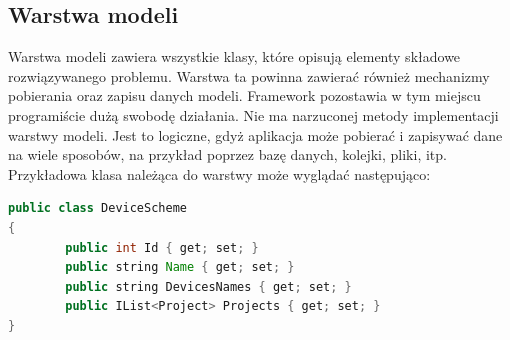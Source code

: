 \subsection{Warstwa modeli}
Warstwa modeli zawiera wszystkie klasy, które opisują elementy składowe rozwiązywanego problemu. Warstwa ta powinna zawierać również mechanizmy pobierania oraz zapisu danych modeli. 
Framework pozostawia w tym miejscu programiście dużą swobodę działania. Nie ma narzuconej metody implementacji warstwy modeli. Jest to logiczne, gdyż aplikacja może pobierać i zapisywać dane na wiele sposobów, na przykład poprzez bazę danych, kolejki, pliki, itp. 
Przykładowa klasa należąca do warstwy może wyglądać następująco:
\begin{lstlisting}[language=Java]
public class DeviceScheme
{
        public int Id { get; set; }
        public string Name { get; set; }
        public string DevicesNames { get; set; }
        public IList<Project> Projects { get; set; }
}
\end{lstlisting}
